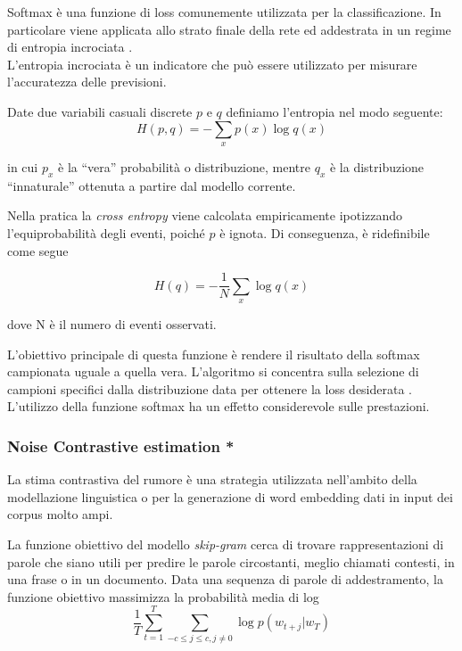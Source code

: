 Softmax è una funzione di loss comunemente utilizzata per la classificazione. In particolare viene applicata allo strato finale della rete ed addestrata in un regime di entropia incrociata \cite{tang2013deep}.\\
L'entropia incrociata è un indicatore che può essere utilizzato per misurare l'accuratezza delle previsioni. 

Date due variabili casuali discrete $p$ e $q$ definiamo l'entropia nel modo seguente:
\begin{equation}
	H(p,q)=-\sum_{x} p(x) \log q(x)
\end{equation}

in cui $p_{x}$ è la ``vera'' probabilità o distribuzione, mentre $q_{x}$ è la distribuzione ``innaturale'' ottenuta a partire dal modello corrente.

Nella pratica la \emph{cross entropy} viene calcolata empiricamente ipotizzando l'equiprobabilità degli eventi, poiché $p$ è ignota. 
Di conseguenza, è ridefinibile come segue

\begin{equation}
H(q)=-\frac{1}{N}\sum_{x} \log q(x)
\end{equation}

dove N è il numero di eventi osservati.

L'obiettivo principale di questa funzione è rendere il risultato della softmax campionata uguale a quella vera. L'algoritmo si concentra sulla selezione di campioni specifici dalla distribuzione data per ottenere la loss desiderata \cite{liu2016large}.  
L'utilizzo della funzione softmax ha un effetto considerevole sulle prestazioni. 

\subsubsection{Noise Contrastive estimation *}
\label{subsubsec:nce}

La stima contrastiva del rumore è una strategia utilizzata nell'ambito della modellazione linguistica o per la generazione di word embedding dati in input dei corpus molto ampi.

La funzione obiettivo del modello \emph{skip-gram} cerca di trovare rappresentazioni di parole che siano utili per predire le parole circostanti, meglio chiamati contesti, in una frase o in un documento. 
Data una sequenza di parole di addestramento, la funzione obiettivo massimizza la probabilità media di log
\begin{equation}
\frac{1}{T}\sum_{t=1}^{T} \sum_{-c \leq j \leq c, j \neq 0} \log p(w_{t+j} | w_T)
\end{equation}

